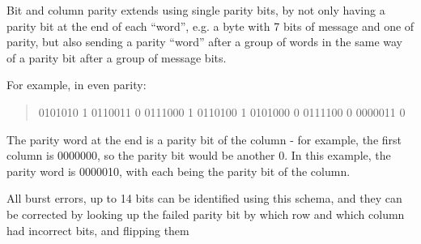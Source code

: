 \documentclass{article}
\begin{document}
Bit and column parity extends using single parity bits, by not only having a
parity bit at the end of each ``word'', e.g. a byte with 7 bits of message and
one of parity, but also sending a parity ``word'' after a group of words in the
same way of a parity bit after a group of message bits.

For example, in even parity:

\begin{quote}
0101010 1 0110011 0 0111000 1 0110100 1 0101000 0 0111100 0 0000011 0
\end{quote}

The parity word at the end is a parity bit of the column - for example, the
first column is 0000000, so the parity bit would be another 0. In this example,
the parity word is 0000010, with each being the parity bit of the column.

All burst errors, up to 14 bits can be identified using this schema, and they
can be corrected by looking up the failed parity bit by which row and which
column had incorrect bits, and flipping them
\end{document}
